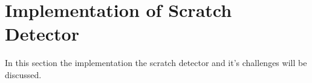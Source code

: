 \section{Implementation of Scratch Detector}
In this section the implementation the scratch detector and it's challenges will be discussed.

\subsection{}
